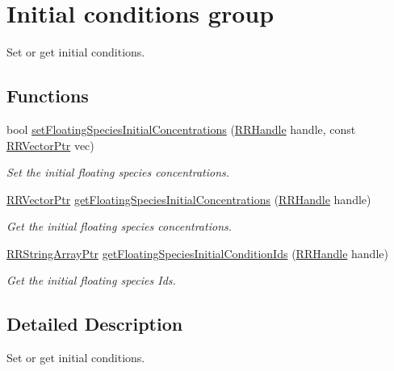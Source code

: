 \hypertarget{group__initial_conditions}{\section{Initial conditions group}
\label{group__initial_conditions}
}


Set or get initial conditions.  


\subsection*{Functions}
\begin{DoxyCompactItemize}
\item 
bool \hyperlink{group__initial_conditions_ga48bea9d12449568647e4f0fc6ea22b3a}{set\+Floating\+Species\+Initial\+Concentrations} (\hyperlink{rrc__types_8h_a1d68f0592372208fa5a5f2799ea4b3ae}{R\+R\+Handle} handle, const \hyperlink{rrc__types_8h_a3be72d6006034fd349f753d2bf441bf7}{R\+R\+Vector\+Ptr} vec)
\begin{DoxyCompactList}\small\item\em Set the initial floating species concentrations. \end{DoxyCompactList}\item 
\hyperlink{rrc__types_8h_a3be72d6006034fd349f753d2bf441bf7}{R\+R\+Vector\+Ptr} \hyperlink{group__initial_conditions_ga2f4703d54375cb17e20887df4eb90032}{get\+Floating\+Species\+Initial\+Concentrations} (\hyperlink{rrc__types_8h_a1d68f0592372208fa5a5f2799ea4b3ae}{R\+R\+Handle} handle)
\begin{DoxyCompactList}\small\item\em Get the initial floating species concentrations. \end{DoxyCompactList}\item 
\hyperlink{rrc__types_8h_a7c9475df6c7337d99482b13a365e7596}{R\+R\+String\+Array\+Ptr} \hyperlink{group__initial_conditions_ga0839c13a84160df0f2b94e9aef0be5b6}{get\+Floating\+Species\+Initial\+Condition\+Ids} (\hyperlink{rrc__types_8h_a1d68f0592372208fa5a5f2799ea4b3ae}{R\+R\+Handle} handle)
\begin{DoxyCompactList}\small\item\em Get the initial floating species Ids. \end{DoxyCompactList}\end{DoxyCompactItemize}


\subsection{Detailed Description}
Set or get initial conditions. 



